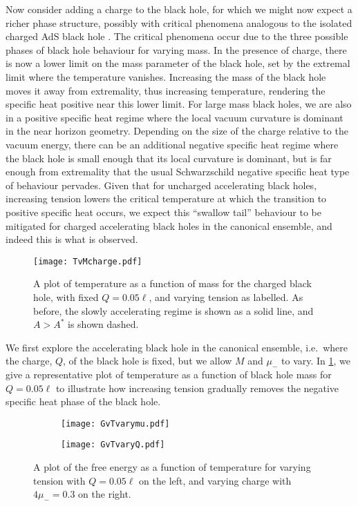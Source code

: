 \documentclass[
twoside,
openright,
frontopenright,
]{dmathesis}
\begin{document}
Now consider adding a charge to the black hole, for which we might now expect a
richer phase structure, possibly with critical phenomena analogous to the
isolated charged AdS black hole
\cite{Chamblin:1999tk,Cvetic:1999ne,Chamblin:1999hg}. The critical phenomena
occur due to the three possible phases of black hole behaviour for varying mass.
In the presence of charge, there is now a lower limit on the mass parameter of
the black hole, set by the extremal limit where the temperature vanishes.
Increasing the mass of the black hole moves it away from extremality, thus
increasing temperature, rendering the specific heat positive near this lower
limit. For large mass black holes, we are also in a positive specific heat
regime where the local vacuum curvature is dominant in the near horizon
geometry.  Depending on the size of the charge relative to the vacuum energy,
there can be an additional negative specific heat regime where the black hole
is small enough that its local curvature is dominant, but is far enough from
extremality that the usual Schwarzschild negative specific heat type of
behaviour pervades.  Given that for uncharged accelerating black holes,
increasing tension lowers the critical temperature at which the transition to
positive specific heat occurs, we expect this ``swallow tail'' behaviour to be
mitigated for charged accelerating black holes in the canonical ensemble, and
indeed this is what is observed.
\begin{figure}
  \centering
  \texttt{[image: TvMcharge.pdf]}
  \caption{\label{fig:TvMcharge}A plot of temperature as a function of mass for
    the charged black hole, with fixed $Q=0.05\ell$, and varying tension as
    labelled. As before, the slowly accelerating regime is shown as a solid
    line, and $A>A^*$ is shown dashed.}
\end{figure}

We first explore the accelerating black hole in the canonical ensemble, i.e.\
where the charge, $Q$, of the black hole is fixed, but we allow $M$ and $\mu_-$
to vary.  In \cref{fig:TvMcharge}, we give a representative plot of
temperature as a function of black hole mass for $Q=0.05\ell$ to illustrate how
increasing tension gradually removes the negative specific heat phase of the
black hole.
\begin{figure}
    \centering
  \begin{subfigure}[b]{0.45\textwidth}
    \texttt{[image: GvTvarymu.pdf]}
    \caption{\label{fig:GvTchargea}}
  \end{subfigure}\quad
  \begin{subfigure}[b]{0.45\textwidth}
    \texttt{[image: GvTvaryQ.pdf]}
    \caption{\label{fig:GvTchargeb}}
  \end{subfigure}
  \caption{\label{fig:GvTcharge}A plot of the free energy as a function of
    temperature for varying tension with $Q=0.05\ell$ on the left, and varying
    charge with $4\mu_-=0.3$ on the right.}
\end{figure}
\end{document}
